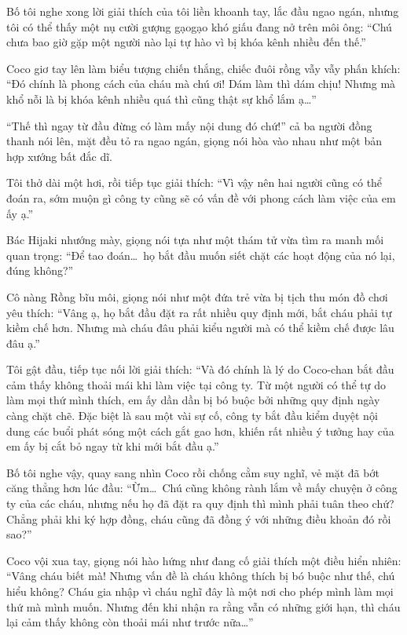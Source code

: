 \documentclass[../main.tex]{subfiles}
\begin{document}
Bố tôi nghe xong lời giải thích của tôi liền khoanh tay, lắc đầu ngao ngán, nhưng tôi có thể thấy một nụ cười gượng gạogạo khó giấu đang nở trên môi ông: ``Chú chưa bao giờ gặp một người nào lại tự hào vì bị khóa kênh nhiều đến thế.''

Coco giơ tay lên làm biểu tượng chiến thắng, chiếc đuôi rồng vẫy vẫy phấn khích: ``Đó chính là phong cách của cháu mà chú ơi! Dám làm thì dám chịu! Nhưng mà khổ nỗi là bị khóa kênh nhiều quá thì cũng thật sự khổ lắm ạ\dots''

``Thế thì ngay từ đầu đừng có làm mấy nội dung đó chứ!'' cả ba người đồng thanh nói lên, mặt đều tỏ ra ngao ngán, giọng nói hòa vào nhau như một bản hợp xướng bất đắc dĩ.

Tôi thở dài một hơi, rồi tiếp tục giải thích: ``Vì vậy nên hai người cũng có thể đoán ra, sớm muộn gì công ty cũng sẽ có vấn đề với phong cách làm việc của em ấy ạ.''

Bác Hijaki nhướng mày, giọng nói tựa như một thám tử vừa tìm ra manh mối quan trọng: ``Để tao đoán\dots\ họ bắt đầu muốn siết chặt các hoạt động của nó lại, đúng không?''

Cô nàng Rồng bĩu môi, giọng nói như một đứa trẻ vừa bị tịch thu món đồ chơi yêu thích: ``Vâng ạ, họ bắt đầu đặt ra rất nhiều quy định mới, bắt cháu phải tự kiềm chế hơn. Nhưng mà cháu đâu phải kiểu người mà có thể kiềm chế được lâu đâu ạ.''

Tôi gật đầu, tiếp tục nối lời giải thích: ``Và đó chính là lý do Coco-chan bắt đầu cảm thấy không thoải mái khi làm việc tại công ty. Từ một người có thể tự do làm mọi thứ mình thích, em ấy dần dần bị bó buộc bởi những quy định ngày càng chặt chẽ. Đặc biệt là sau một vài sự cố, công ty bắt đầu kiểm duyệt nội dung các buổi phát sóng một cách gắt gao hơn, khiến rất nhiều ý tưởng hay của em ấy bị cắt bỏ ngay từ khi mới bắt đầu ạ.''

Bố tôi nghe vậy, quay sang nhìn Coco rồi chống cằm suy nghĩ, vẻ mặt đã bớt căng thẳng hơn lúc đầu: ``Ừm\dots\ Chú cũng không rành lắm về mấy chuyện ở công ty của các cháu, nhưng nếu họ đã đặt ra quy định thì mình phải tuân theo chứ? Chẳng phải khi ký hợp đồng, cháu cũng đã đồng ý với những điều khoản đó rồi sao?''

Coco vội xua tay, giọng nói hào hứng như đang cố giải thích một điều hiển nhiên: ``Vâng cháu biết mà! Nhưng vấn đề là cháu không thích bị bó buộc như thế, chú hiểu không? Cháu gia nhập \hll vì cháu nghĩ đây là một nơi cho phép mình làm mọi thứ mà mình muốn. Nhưng đến khi nhận ra rằng vẫn có những giới hạn, thì cháu lại cảm thấy không còn thoải mái như trước nữa\dots''
\end{document}
